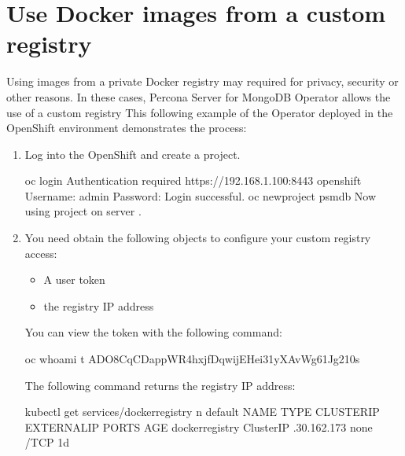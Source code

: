 \documentclass[letterpaper,10pt,english]{sphinxmanual}
\begin{document}
\chapter{Use Docker images from a custom registry}
\label{\detokenize{custom-registry:use-docker-images-from-a-custom-registry}}\label{\detokenize{custom-registry:custom-registry}}\label{\detokenize{custom-registry::doc}}
Using images from a private Docker registry may required for
privacy, security or other reasons. In these cases, Percona Server for
MongoDB Operator allows the use of a custom registry This following example of the
Operator deployed in the OpenShift environment demonstrates the process:
\begin{enumerate}
%
\item {} 
Log into the OpenShift and create a project.

\begin{sphinxVerbatim}[commandchars=\\\{\}]
\PYGZdl{} oc login
Authentication required  https://192.168.1.100:8443 openshift
Username: admin
Password:
Login successful.
\PYGZdl{} oc new\PYGZhy{}project psmdb
Now using project  on server .
\end{sphinxVerbatim}

\item {} 
You need obtain the following objects to configure your custom registry
access:
\begin{itemize}
\item {} 
A user token

\item {} 
the registry IP address

\end{itemize}

You can view the token with the following command:

\begin{sphinxVerbatim}[commandchars=\\\{\}]
\PYGZdl{} oc whoami \PYGZhy{}t
ADO8CqCDappWR4hxjfDqwijEHei31yXAvWg61Jg210s
\end{sphinxVerbatim}

The following command returns the registry IP address:

\begin{sphinxVerbatim}[commandchars=\\\{\}]
\PYGZdl{} kubectl get services/docker\PYGZhy{}registry \PYGZhy{}n default
NAME              TYPE        CLUSTER\PYGZhy{}IP       EXTERNAL\PYGZhy{}IP   PORTS    AGE
docker\PYGZhy{}registry   ClusterIP   .30.162.173   \PYGZlt{}none\PYGZgt{}        /TCP   1d
\end{sphinxVerbatim}


\end{enumerate}
\end{document}
